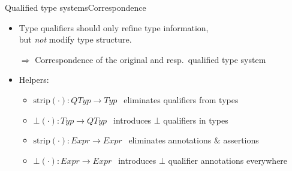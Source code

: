 \documentclass{beamer}
\begin{document}


\begin{frame}{Qualified type systems}{Correspondence}
  \begin{itemize}
  \item Type qualifiers should only refine type information,\\ but \emph{not} modify type structure.
  \item[$\Rightarrow$] Correspondence of the original and resp.\ qualified type system
  \item<2-> Helpers:\\
    \begin{itemize}
    \item $\text{strip}(\cdot): \mathit{QTyp} \rightarrow \mathit{Typ}~~$ eliminates qualifiers from types\\
    \item $\bot(\cdot): \mathit{Typ} \rightarrow \mathit{QTyp}~~$ introduces $\bot$ qualifiers in types\\
    \item<5-> $\text{strip}(\cdot): \mathit{Expr} \rightarrow \mathit{Expr}~~$ eliminates annotations \& assertions\\
    \item<5-> $\bot(\cdot): \mathit{Expr} \rightarrow \mathit{Expr}~~$ introduces $\bot$ qualifier annotations everywhere
    \end{itemize}
  \end{itemize}
\end{frame}
\end{document}
